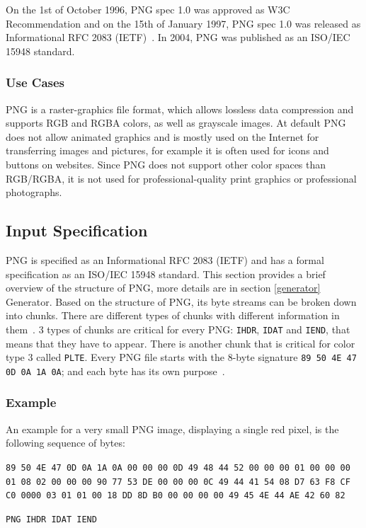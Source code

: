\documentclass[runningheads]{llncs}
\begin{document}
On the 1st of October 1996, PNG spec 1.0 was approved as W3C
Recommendation and on the 15th of January 1997, PNG spec 1.0 was released as
Informational RFC 2083 (IETF)~\cite{PNG_specification}. In 2004, PNG was published as an ISO/IEC 15948
standard.

\subsubsection{Use Cases}
PNG is a raster-graphics file format, which allows lossless data compression and
supports RGB and RGBA colors, as well as grayscale images. At default PNG does not allow
animated graphics and is mostly used on the Internet for transferring images and
pictures, for example it is often used for icons and buttons on websites.
Since PNG does not support other color spaces than RGB/RGBA, it is not used for
professional-quality print graphics or professional photographs.

\subsection{Input Specification}
PNG is specified as an Informational RFC 2083 (IETF) and has a formal specification as
an ISO/IEC 15948 standard.
This section provides a brief overview of the structure of PNG, more details are in
section \ref{generator} Generator. Based on the structure of PNG, its byte streams can be broken
down into chunks. There are different types of chunks with different information in
them~\cite{libpng_chunks}. 3 types of chunks are critical for every PNG: \texttt{IHDR}, \texttt{IDAT} and \texttt{IEND}, that means
that they have to appear. There is another chunk that is critical for color type 3 called
\texttt{PLTE}. Every PNG file starts with the 8-byte signature \texttt{89 50 4E 47 0D 0A 1A 0A};
and each byte has its own purpose~\cite{libpng_rationale}.

\subsubsection{Example}
An example for a very small PNG image, displaying a single red pixel, is the following sequence of bytes:

\begin{center}
    \texttt{\color{NavyBlue}89 50 4E 47 0D 0A \color{PineGreen}1A 0A 00 00 00 0D 49 48 44 52 00 00 00 01 00 00 00 01 08 02
00 00 00 90 77 53 \color{Violet}DE 00 00 00 0C 49 44 41 54 08 D7 63 F8 CF C0 0000 03 01 01 00
18 DD 8D B0 \color{Plum}00 00 00 00 49 45 4E 44 AE 42 60 82}

\texttt{\color{NavyBlue}PNG \color{PineGreen}IHDR \color{Violet}IDAT \color{Plum}IEND}
\end{center}
\end{document}

